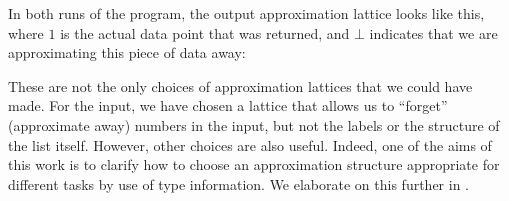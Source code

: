 \begin{example}
\begin{center}
  \end{center}
  In both runs of the program, the output approximation lattice looks like this, where $1$ is the actual data point that was returned, and $\bot$ indicates that we are approximating this piece of data away:
  \begin{center}
  \end{center}
  These are not the only choices of approximation lattices that we could have made. For the input, we have chosen a lattice that allows us to ``forget'' (approximate away) numbers in the input, but not the labels or the structure of the list itself. However, other choices are also useful. Indeed, one of the aims of this work is to clarify how to choose an approximation structure appropriate for different tasks by use of type information. We elaborate on this further in .


\end{example}
